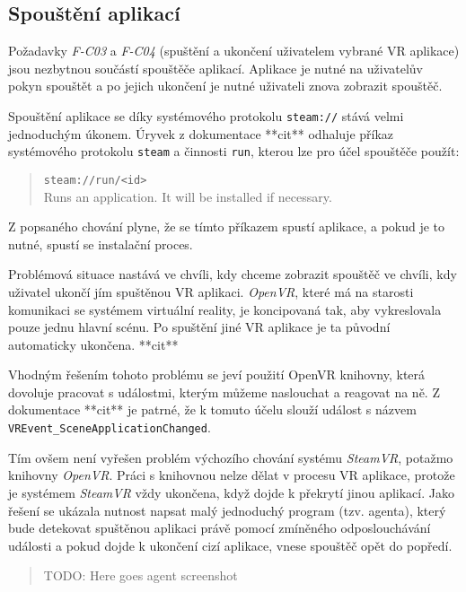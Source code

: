 \subsection{Spouštění
aplikací}\label{spouux161tux11bnuxed-aplikacuxed}

Požadavky \emph{F-C03} a \emph{F-C04} (spuštění a ukončení uživatelem
vybrané VR aplikace) jsou nezbytnou součástí spouštěče
aplikací. Aplikace je nutné na uživatelův pokyn spouštět a po jejich ukončení 
je nutné uživateli znova zobrazit spouštěč.

Spouštění aplikace se díky systémového protokolu \texttt{steam://} stává
velmi jednoduchým úkonem. Úryvek z dokumentace **cit** odhaluje příkaz
systémového protokolu \texttt{steam} a činnosti \texttt{run}, kterou lze
pro účel spouštěče použít:

\begin{quote}
\texttt{steam://run/\textless{}id\textgreater{}}\\
Runs an application. It will be installed if necessary.
\end{quote}

Z popsaného chování plyne, že se tímto příkazem spustí aplikace, a pokud je
to nutné, spustí se instalační proces. 

Problémová situace nastává ve
chvíli, kdy chceme zobrazit spouštěč ve chvíli, kdy uživatel
ukončí jím spuštěnou VR aplikaci. \emph{OpenVR}, které má na starosti
komunikaci se systémem virtuální reality, je koncipovaná tak, 
aby vykreslovala pouze jednu hlavní scénu. Po spuštění jiné VR aplikace 
je ta původní automaticky ukončena. **cit**

Vhodným řešením tohoto problému se jeví použití OpenVR knihovny, která
dovoluje pracovat s událostmi, kterým můžeme naslouchat a reagovat na
ně. Z dokumentace **cit** je patrné, že k tomuto účelu slouží událost s názvem
\texttt{VREvent\_SceneApplicationChanged}. 

Tím ovšem není vyřešen
problém výchozího chování systému \emph{SteamVR}, potažmo knihovny
\emph{OpenVR}. Práci s knihovnou nelze dělat v procesu VR aplikace,
protože je systémem \emph{SteamVR} vždy ukončena, když dojde k 
překrytí jinou aplikací. Jako řešení se ukázala nutnost napsat malý 
jednoduchý program (tzv. agenta), který bude detekovat spuštěnou aplikaci právě
pomocí zmíněného odposlouchávání události a pokud dojde k ukončení cizí 
aplikace, vnese spouštěč opět do popředí.

\begin{quote}
TODO: Here goes agent screenshot
\end{quote}

